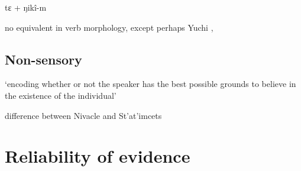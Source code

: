\documentclass[oneside,a4paper,11pt]{article}
\newcommand{\ipa}[1]{{\phon \mbox{#1}}} %
\begin{document}
 \ipa{tɛ} + \ipa{ŋikî-m}

 
no equivalent in verb morphology, except perhaps Yuchi \citealt[37]{aikhenvald06}
\citet{wagner38yuchi}, \citet{linn01euchee}




\begin{table}
\caption{Systems     including auditory demonstratives } \label{tab:attested}
\end{table}	


\citet{aikhenvald14knowledge}
\citet{dixon14nonvisible}
\citet{storch14maaka}
\citet{yang00hearsay}
\citet{yang00tsou.case}
 
 
\subsection{Non-sensory} 
  \citet[171-3]{eijk97lillooet}
 
 \citet{gutierrez11evidentiality} `encoding whether or not the speaker has the best possible grounds to believe in the existence of the individual' 
 
 difference between Nivacle and St'at'imcets
 
\section{Reliability of evidence}
\citet{gutierrez11evidentiality}
\citet{matthewson07epistemic}
\citet{gutierrez12determiners}

\citet[282]{lowe99nambiquara} 
 
\end{document}
